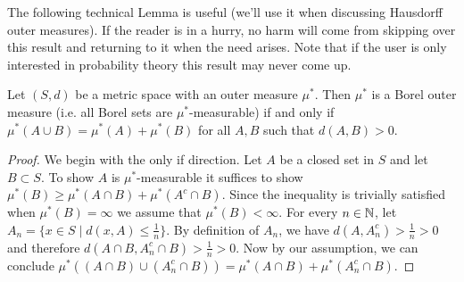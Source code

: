 The following technical Lemma is useful (we'll use it when
discussing Hausdorff outer measures).  If the reader is in a hurry,
no harm will come from skipping over this result and returning to it
when the need arises.  Note that if the user is only interested in
probability theory this result may never come up.
\begin{lem}\label{CaratheodoryCriterion}Let $(S,d)$ be a metric space with an outer measure $\mu^*$.
  Then $\mu^*$ is a Borel outer measure (i.e. all Borel sets are
  $\mu^*$-measurable) if and only if $\mu^*(A \cup B) = \mu^*(A) +
  \mu^*(B)$ for all $A,B$ such that $d(A, B) > 0$.
\end{lem}
\begin{proof}
We begin with the only if direction.  Let $A$ be a closed set in $S$
and let $B \subset S$.  To show $A$ is $\mu^*$-measurable it suffices
to show $\mu^*(B) \geq \mu^*(A \cap B) + \mu^*(A^c \cap B)$.  Since
the inequality is trivially satisfied when $\mu^*(B) = \infty$ we
assume that $\mu^*(B) < \infty$.  For
every $n \in \mathbb{N}$, let $A_n =
\lbrace x \in S \mid d(x, A) \leq \frac{1}{n} \rbrace$.  By definition
of $A_n$, we have $d(A,
A_n^c) > \frac{1}{n} > 0$ and therefore $d(A \cap B, A_n^c \cap B)
> \frac{1}{n} > 0$.  Now by our assumption, we can conclude $\mu^*((A
\cap B) \cup (A_n^c \cap B)) = \mu^*(A \cap B) +
\mu^*(A_n^c \cap B)$.


\end{proof}
